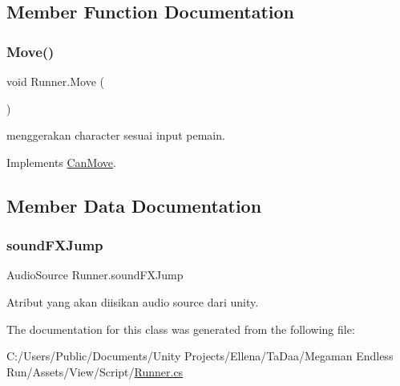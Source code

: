 \subsection{Member Function Documentation}
\hypertarget{class_runner_add0c89849fa2e023ed488ba80c7daf4a}{}\label{class_runner_add0c89849fa2e023ed488ba80c7daf4a} 
\subsubsection{\texorpdfstring{Move()}{Move()}}
{\footnotesize\ttfamily void Runner.\+Move (\begin{DoxyParamCaption}{ }\end{DoxyParamCaption})}



menggerakan character sesuai input pemain. 



Implements \hyperlink{interface_can_move_a2c40a4dc4684e8f04e31ff59d4ec74e0}{Can\+Move}.



\subsection{Member Data Documentation}
\hypertarget{class_runner_a7480846642a3f6ed85a33479d93a46eb}{}\label{class_runner_a7480846642a3f6ed85a33479d93a46eb} 
\subsubsection{\texorpdfstring{sound\+F\+X\+Jump}{soundFXJump}}
{\footnotesize\ttfamily Audio\+Source Runner.\+sound\+F\+X\+Jump}



Atribut yang akan diisikan audio source dari unity. 



The documentation for this class was generated from the following file\+:\begin{DoxyCompactItemize}
\item 
C\+:/\+Users/\+Public/\+Documents/\+Unity Projects/\+Ellena/\+Ta\+Daa/\+Megaman Endless Run/\+Assets/\+View/\+Script/\hyperlink{_runner_8cs}{Runner.\+cs}\end{DoxyCompactItemize}
